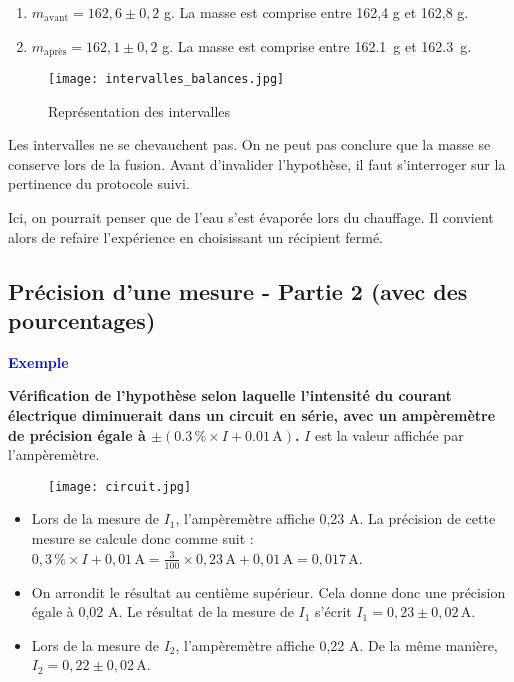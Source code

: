 \documentclass[a4paper,12pt]{article}
\begin{document}
\begin{enumerate}[noitemsep]
    \item $m_{\text{avant}} = 162,6 \pm 0,2$ g. La masse est comprise entre 162,4 g et 162,8 g.
    \item $m_{\text{après}} = 162,1 \pm 0,2$ g. La masse est comprise entre \SI{162,1}{g} et \SI{162,3}{g}.
\end{enumerate}


\begin{figure}[H]
  \centering
  \texttt{[image: intervalles\_balances.jpg]}
  \caption{Représentation des intervalles}
\end{figure}

Les intervalles ne se chevauchent pas. On ne peut pas conclure que la masse se conserve lors de la fusion.
Avant d'invalider l'hypothèse, il faut s'interroger sur la pertinence du protocole suivi.

\vspace{1em}

Ici, on pourrait penser que de l'eau s'est évaporée lors du chauffage. Il convient alors de refaire l'expérience en choisissant un récipient fermé.

\subsection{Précision d'une mesure - Partie 2 (avec des pourcentages)}


\textcolor{blue}{\textbf{Exemple}}

\vspace{1em}

\textbf{Vérification de l’hypothèse selon laquelle l’intensité du courant électrique diminuerait dans un circuit en série, avec un ampèremètre de précision égale à $\pm (0.3 \, \% \times I + 0.01 \, \text{A})$.} $I$ est la valeur affichée par l’ampèremètre.

\begin{figure}[H]
  \centering
  \texttt{[image: circuit.jpg]}
\end{figure}

\begin{itemize}[noitemsep]
    \item Lors de la mesure de $I_1$, l’ampèremètre affiche 0,23 A.
    La précision de cette mesure se calcule donc comme suit :
    $0,3 \, \% \times I + 0,01 \, \text{A} = \frac{3}{100} \times 0,23 \, \text{A} + 0,01 \, \text{A} = 0,017 \, \text{A}$.
    
    \item On arrondit le résultat au centième supérieur.
    Cela donne donc une précision égale à 0,02 A.
    Le résultat de la mesure de $I_1$ s’écrit \textbf{$I_1 = 0,23 \pm 0,02 \, \text{A}$}.
    
    \item Lors de la mesure de $I_2$, l’ampèremètre affiche 0,22 A.
    De la même manière, \textbf{$I_2 = 0,22 \pm 0,02 \, \text{A}$}.
\end{itemize}
\end{document}
